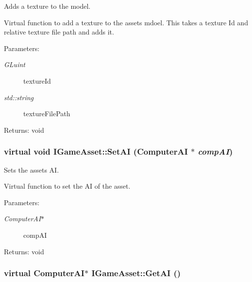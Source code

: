 Adds a texture to the model. 

Virtual function to add a texture to the assets mdoel. This takes a texture Id and relative texture file path and adds it.

\begin{Desc}
\item[Parameters:]
\begin{description}
\item[{\em GLuint}]textureId \item[{\em std::string}]textureFilePath \end{description}
\end{Desc}
\begin{Desc}
\item[Returns:]void \end{Desc}
\hypertarget{class_i_game_asset_5b487893a4ef77c9522b3d8ff68c4e25}{
\subsubsection[SetAI]{\setlength{\rightskip}{0pt plus 5cm}virtual void IGameAsset::SetAI (ComputerAI $\ast$ {\em compAI})}}
\label{class_i_game_asset_5b487893a4ef77c9522b3d8ff68c4e25}


Sets the assets AI. 

Virtual function to set the AI of the asset.

\begin{Desc}
\item[Parameters:]
\begin{description}
\item[{\em ComputerAI$\ast$}]compAI \end{description}
\end{Desc}
\begin{Desc}
\item[Returns:]void \end{Desc}
\hypertarget{class_i_game_asset_41a27cd2c0dc69ea041b69d3a60dfc22}{
\subsubsection[GetAI]{\setlength{\rightskip}{0pt plus 5cm}virtual ComputerAI$\ast$ IGameAsset::GetAI ()}}
\label{class_i_game_asset_41a27cd2c0dc69ea041b69d3a60dfc22}


